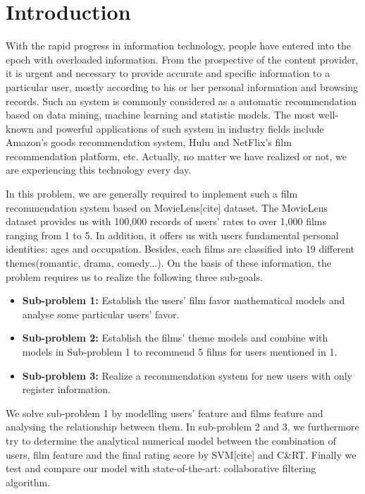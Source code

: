 
\section{Introduction}
With the rapid progress in information technology, people have entered into the epoch with overloaded information. From the prospective of the content provider, it is urgent and necessary to provide accurate and specific information to a particular user, mostly according to his or her personal information and browsing records. Such an system is commonly considered as a automatic recommendation based on data mining, machine learning and statistic models. The most well-known and powerful applications of such system in industry fields include Amazon's goods recommendation system, Hulu and NetFlix's film recommendation platform, etc. Actually, no matter we have realized or not, we are experiencing this technology every day. 

In this problem, we are generally required to implement such a film recommendation system based on MovieLens[cite] dataset. The MovieLens dataset provides us with 100,000 records of users' rates to over 1,000 films ranging from 1 to 5. In addition, it offers us with users fundamental personal identities: ages and occupation. Besides, each films are classified into 19 different themes(romantic, drama, comedy...). On the basis of these information, the problem requires us to realize the following three sub-goals.
\begin{itemize}
\item \textbf{Sub-problem 1:} Establish the users' film favor mathematical models and analyse some particular users' favor. 
\item \textbf{Sub-problem 2:} Establish the films' theme models and combine with models in Sub-problem 1 to recommend 5 films for users mentioned in 1.  
\item\textbf{ Sub-problem 3:} Realize a recommendation system for new users with only register information.
\end{itemize} 

We solve sub-problem 1 by modelling users' feature and films feature and analysing the relationship between them. In sub-problem 2 and 3, we furthermore try to determine the analytical numerical model between the combination of users, film feature and the final rating score by SVM[cite] and C\&RT. Finally we test and compare our model with state-of-the-art: collaborative filtering algorithm.

